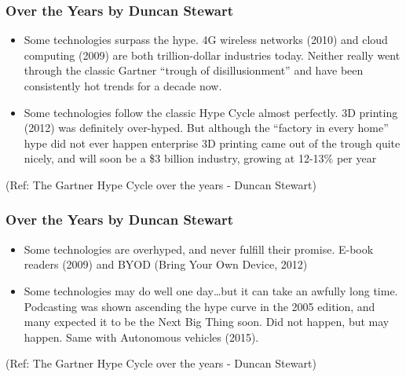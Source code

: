 \begin{frame}[fragile]\frametitle{Over the Years by Duncan Stewart}


\begin{itemize}
\item Some technologies surpass the hype. 4G wireless networks (2010) and cloud computing (2009) are both trillion-dollar industries today. Neither really went through the classic Gartner “trough of disillusionment” and have been consistently hot trends for a decade now.

\item Some technologies follow the classic Hype Cycle almost perfectly. 3D printing (2012) was definitely over-hyped. But although the “factory in every home” hype did not ever happen enterprise 3D printing came out of the trough quite nicely, and will soon be a \$3 billion industry, growing at 12-13\% per year

\end{itemize}

{\tiny (Ref: The Gartner Hype Cycle over the years - Duncan Stewart)}


\end{frame}

\begin{frame}[fragile]\frametitle{Over the Years by Duncan Stewart}


\begin{itemize}
\item Some technologies are overhyped, and never fulfill their promise. E-book readers (2009) and BYOD (Bring Your Own Device, 2012)

\item Some technologies may do well one day…but it can take an awfully long time. Podcasting was shown ascending the hype curve in the 2005 edition, and many expected it to be the Next Big Thing soon. Did not happen, but may happen. Same with Autonomous vehicles (2015).
\end{itemize}

{\tiny (Ref: The Gartner Hype Cycle over the years - Duncan Stewart)}


\end{frame}

